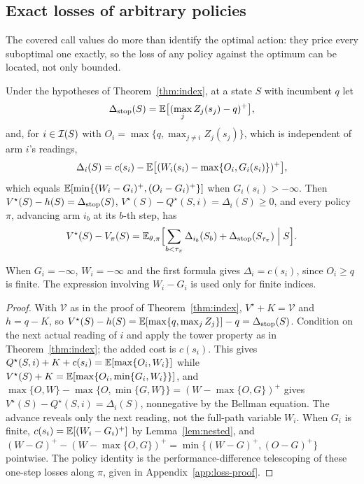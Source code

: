\subsection{Exact losses of arbitrary policies}
\label{sec:loss}
The covered call values do more than identify the optimal action: they price every suboptimal one
exactly, so the loss of any policy against the optimum can be located, not only bounded.

\begin{theorem}\label{thm:loss}
Under the hypotheses of Theorem~\ref{thm:index}, at a state $S$ with incumbent $q$ let
\[
\Delta_{\rm stop}(S)=\mathbb{E}\bigl[(\max_jZ_j(s_j)-q)^+\bigr],
\]
and, for $i\in\mathcal{I}(S)$ with $O_i=\max\{q,\max_{j\ne i}Z_j(s_j)\}$, which is independent of arm
$i$'s readings,
\[
\Delta_i(S)=c(s_i)-\mathbb{E}\bigl[(W_i(s_i)-\max\{O_i,G_i(s_i)\})^+\bigr],
\]
which equals $\mathbb{E}[\min\{(W_i-G_i)^+,(O_i-G_i)^+\}]$ when $G_i(s_i)>-\infty$. Then
$V^\star(S)-h(S)=\Delta_{\rm stop}(S)$, $V^\star(S)-Q^\star(S,i)=\Delta_i(S)\ge0$, and every
policy $\pi$, advancing arm $i_b$ at its $b$-th step, has
\[
V^\star(S)-V_\pi(S)=\mathbb{E}_{\theta,\pi}\Bigl[\sum_{b<\tau_\pi}\Delta_{i_b}(S_b)+\Delta_{\rm stop}(S_{\tau_\pi})\Bigm|S\Bigr].
\]
\end{theorem}
When $G_i=-\infty$, $W_i=-\infty$ and the first formula gives $\Delta_i=c(s_i)$, since
$O_i\ge q$ is finite. The expression involving $W_i-G_i$ is used only for finite indices.
\begin{proof}
With $\mathcal V$ as in the proof of Theorem~\ref{thm:index}, $V^\star+K=\mathcal V$ and $h=q-K$, so
$V^\star(S)-h(S)=\mathbb{E}[\max\{q,\max_jZ_j\}]-q=\Delta_{\rm stop}(S)$.
Condition on the next actual reading of $i$ and apply the tower property as in
Theorem~\ref{thm:index}; the added cost is $c(s_i)$. This gives
$Q^\star(S,i)+K+c(s_i)=\mathbb{E}[\max\{O_i,W_i\}]$ while
$V^\star(S)+K=\mathbb{E}[\max\{O_i,\min\{G_i,W_i\}\}]$, and
$\max\{O,W\}-\max\{O,\min\{G,W\}\}=(W-\max\{O,G\})^+$ gives $V^\star(S)-Q^\star(S,i)=\Delta_i(S)$,
nonnegative by the Bellman equation. The advance reveals only the next reading,
not the full-path variable $W_i$. When $G_i$ is finite, $c(s_i)=\mathbb{E}[(W_i-G_i)^+]$ by
Lemma~\ref{lem:nested}, and $(W-G)^+-(W-\max\{O,G\})^+=\min\{(W-G)^+,(O-G)^+\}$ pointwise.
The policy identity is the performance-difference telescoping of these one-step losses along
$\pi$, given in Appendix~\ref{app:loss-proof}.
\end{proof}

